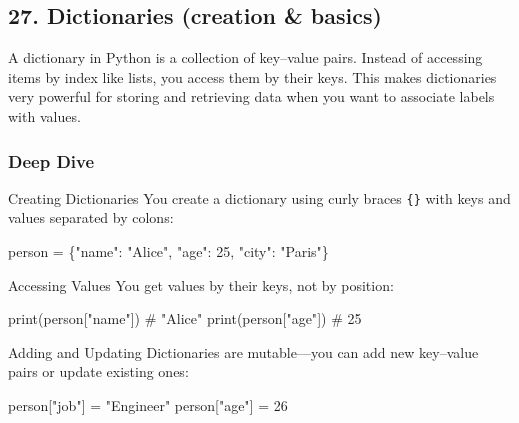 \documentclass[
  letterpaper,
  DIV=11,
  numbers=noendperiod]{scrreprt}
\newenvironment{Shaded}{\begin{snugshade}}{\end{snugshade}}
\newcommand{\BuiltInTok}[1]{\textcolor[rgb]{0.00,0.23,0.31}{#1}}
\newcommand{\CommentTok}[1]{\textcolor[rgb]{0.37,0.37,0.37}{#1}}
\newcommand{\DecValTok}[1]{\textcolor[rgb]{0.68,0.00,0.00}{#1}}
\newcommand{\NormalTok}[1]{\textcolor[rgb]{0.00,0.23,0.31}{#1}}
\newcommand{\OperatorTok}[1]{\textcolor[rgb]{0.37,0.37,0.37}{#1}}
\newcommand{\StringTok}[1]{\textcolor[rgb]{0.13,0.47,0.30}{#1}}
\begin{document}
\subsection{27. Dictionaries (creation \&
basics)}\label{dictionaries-creation-basics}

A dictionary in Python is a collection of key--value pairs. Instead of
accessing items by index like lists, you access them by their keys. This
makes dictionaries very powerful for storing and retrieving data when
you want to associate labels with values.

\subsubsection{Deep Dive}\label{deep-dive-27}

Creating Dictionaries You create a dictionary using curly braces
\texttt{\{\}} with keys and values separated by colons:

\begin{Shaded}
\begin{Highlighting}[]
\NormalTok{person }\OperatorTok{=}\NormalTok{ \{}\StringTok{"name"}\NormalTok{: }\StringTok{"Alice"}\NormalTok{, }\StringTok{"age"}\NormalTok{: }\DecValTok{25}\NormalTok{, }\StringTok{"city"}\NormalTok{: }\StringTok{"Paris"}\NormalTok{\}}
\end{Highlighting}
\end{Shaded}

Accessing Values You get values by their keys, not by position:

\begin{Shaded}
\begin{Highlighting}[]
\BuiltInTok{print}\NormalTok{(person[}\StringTok{"name"}\NormalTok{])   }\CommentTok{\# "Alice"}
\BuiltInTok{print}\NormalTok{(person[}\StringTok{"age"}\NormalTok{])    }\CommentTok{\# 25}
\end{Highlighting}
\end{Shaded}

Adding and Updating Dictionaries are mutable---you can add new
key--value pairs or update existing ones:

\begin{Shaded}
\begin{Highlighting}[]
\NormalTok{person[}\StringTok{"job"}\NormalTok{] }\OperatorTok{=} \StringTok{"Engineer"}
\NormalTok{person[}\StringTok{"age"}\NormalTok{] }\OperatorTok{=} \DecValTok{26}
\end{Highlighting}
\end{Shaded}
\end{document}
